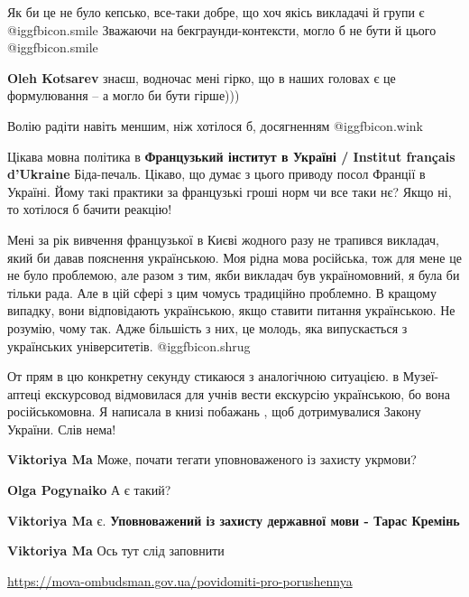 \begin{itemize}

Як би це не було кепсько, все-таки добре, що хоч якісь викладачі й групи є  @igg{fbicon.smile} 
Зважаючи на бекграунди-контексти, могло б не бути й цього  @igg{fbicon.smile} 

\begin{itemize} %
\textbf{Oleh Kotsarev} знаєш, водночас мені гірко, що в наших головах є це формулювання – а могло би бути гірше)))

Волію радіти навіть меншим, ніж хотілося б, досягненням  @igg{fbicon.wink} 
\end{itemize} %


Цікава мовна політика в \textbf{Французький інститут в Україні / Institut français
d'Ukraine} Біда-печаль. Цікаво, що думає з цього приводу посол Франції в
Україні. Йому такі практики за французькі гроші норм чи все таки нє? Якщо ні,
то хотілося б бачити реакцію!


Мені за рік вивчення французької в Києві жодного разу не трапився викладач,
який би давав пояснення українською. Моя рідна мова російська, тож для мене це
не було проблемою, але разом з тим, якби викладач був україномовний, я була би
тільки рада. Але в цій сфері з цим чомусь традиційно проблемно. В кращому
випадку, вони відповідають українською, якщо ставити питання українською. Не
розумію, чому так. Адже більшість з них, це молодь, яка випускається з
українських університетів.  @igg{fbicon.shrug} 


От прям в цю конкретну секунду стикаюся з аналогічною ситуацією. в Музеї-аптеці
екскурсовод відмовилася для учнів вести екскурсію українською, бо вона
російськомовна. Я написала в книзі побажань , щоб дотримувалися Закону України.
Слів нема!

\begin{itemize} %
\textbf{Viktoriya Ma} Може, почати тегати уповноваженого із захисту укрмови?

\textbf{Olga Pogynaiko} А є такий?

\textbf{Viktoriya Ma} є. \textbf{Уповноважений із захисту державної мови - Тарас Кремінь}

\textbf{Viktoriya Ma} Ось тут слід заповнити \par\url{https://mova-ombudsman.gov.ua/povidomiti-pro-porushennya}


\end{itemize}
\end{itemize}
